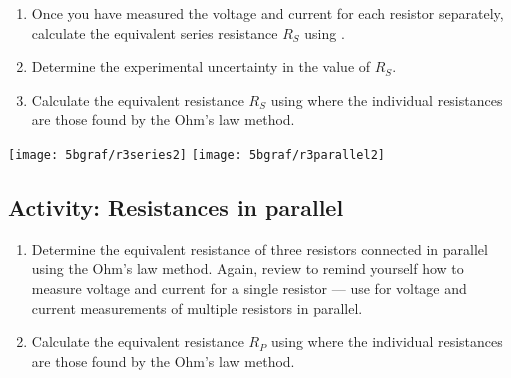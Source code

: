 \begin{multicols}{2}
\begin{enumerate}
	\item Once you have measured the voltage and current for each resistor separately, calculate the equivalent series resistance $R_S$ using .
	
	\item Determine the experimental uncertainty in the value of $R_S$. %
	
	\item Calculate the equivalent resistance $R_S$ using  where the individual resistances are those found by the Ohm's law method.
\end{enumerate}



\begin{center}
   {\texttt{[image: 5bgraf/r3series2]}
   \label{f:r3series}} %
	\vskip 0.5cm
   {\texttt{[image: 5bgraf/r3parallel2]}
   \label{f:r3par}} %
 \label{f:serpar}
\end{center}


\subsection{Activity: Resistances in parallel}
\begin{enumerate}
	\item Determine the equivalent resistance of three resistors connected in parallel using the Ohm's law method.  Again, review  to remind yourself how to measure voltage and current for a single resistor --- use  for voltage and current measurements of multiple resistors in parallel.
	
	\item Calculate the equivalent resistance $R_P$ using  where the individual resistances are those found by the Ohm's law method.


\end{enumerate}
\end{multicols}
